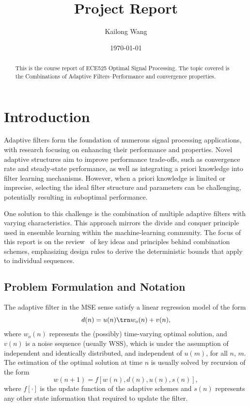 \documentclass{article}
\title{Project Report}
\author{Kailong Wang}
\date{\today}
\begin{document}
\maketitle

\begin{abstract}
This is the course report of ECE525 Optimal Signal Processing. The topic covered is the Combinations of Adaptive Filters--Performance and convergence properties.
\end{abstract}

\section{Introduction}
Adaptive filters form the foundation of numerous signal processing applications, with research focusing on enhancing their performance and properties.
Novel adaptive structures aim to improve performance trade-offs, such as convergence rate and steady-state performance, as well as integrating a priori knowledge into filter learning mechanisms.
However, when a priori knowledge is limited or imprecise, selecting the ideal filter structure and parameters can be challenging, potentially resulting in suboptimal performance.

One solution to this challenge is the combination of multiple adaptive filters with varying characteristics.
This approach mirrors the divide and conquer principle used in ensemble learning within the machine-learning community.
The focus of this report is on the review~\cite{Arenas_Garcia_2016} of key ideas and principles behind combination schemes, emphasizing design rules to derive the deterministic bounds that apply to individual sequences.

\subsection{Problem Formulation and Notation}
The adaptive filter in the MSE sense satisfy a linear regression model of the form
\begin{equation}
    d(n) = u(n)\trn w_o(n)+v(n),
\end{equation}
where $w_o(n)$ represents the (possibly) time-varying optimal solution, and $v(n)$ is a noise sequence (usually WSS), which is under the assumption of independent and identically distributed, and independent of $u(m)$, for all $n$, $m$.
The estimation of the optimal solution at time $n$ is usually solved by recursion of the form\begin{equation}
    w(n+1)=f[w(n), d(n), u(n), s(n)],
\end{equation}
where $f[\cdot]$ is the update function of the adaptive schemes and $s(n)$ represents any other state information that required to update the filter.
\end{document}

